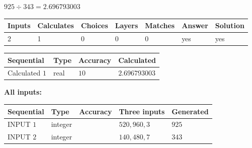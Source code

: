 \documentclass{ctexart}
\begin{document}
 

 
 
 
\noindent{}
 
 

$ %
925 \div  %
343=   %
2.696793003$
 
 
\noindent{}
 
 

 
   
   
   
   
\noindent\begin{tabular}{|l|l|l|l|l|l|l|}
 \hline
Inputs & Calculates & Choices & Layers & Matches & Answer & Solution \\ \hline
 2  & 
 1  & 
 0
  & 
 0  & 
 0  & 
  yes & 
  yes 
  \\ \hline
 \end{tabular}
   
   
   
   
\noindent{}
   
   
  
  
\noindent\begin{tabular}{|l|l|l|l|}
\hline
 Sequential & Type & Accuracy & Calculated \\ 
\hline
 
 
  Calculated $  1 $ & real & $  10  $ & 
 $ 2.696793003 $ 
 \\  \hline  
 \end{tabular}
   
   
   
   
\noindent\vspace{0.1in}\hspace{-0.08in} {\textbf{\Large{All inputs: }}}
   
   
  
  
\noindent\begin{tabular}{|l|l|l|l|l|}
\hline
 Sequential & Type & Accuracy & Three inputs & Generated \\ 
\hline
 
 
  INPUT $  1 $ & integer &  & $
 520
 , 
 960
 , 
 3
 $ & $ 925 $ 
 \\  \hline  
 
 
  INPUT $  2 $ & integer &  & $
 140
 , 
 480
 , 
 7
 $ & $ 343 $ 
 \\  \hline  
 \end{tabular}
   
\end{document}

